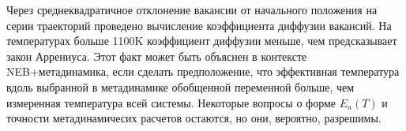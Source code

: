 \documentclass[master,14pt,subf,href,colorlinks=true
]{disser}
\begin{document}
Через среднеквадратичное отклонение вакансии от начального положения на серии траекторий проведено вычисление коэффициента диффузии вакансий. На температурах больше 1100K коэффициент диффузии меньше, чем предсказывает закон Аррениуса. Этот факт может быть объяснен в контексте NEB+метадинамика, если сделать предположение, что эффективная температура вдоль выбранной в метадинамике обобщенной переменной больше, чем измеренная температура всей системы.
Некоторые вопросы о форме $E_a(T)$ и точности метадинамичесих расчетов остаются, но они, вероятно, разрешимы.




%
\end{document}
